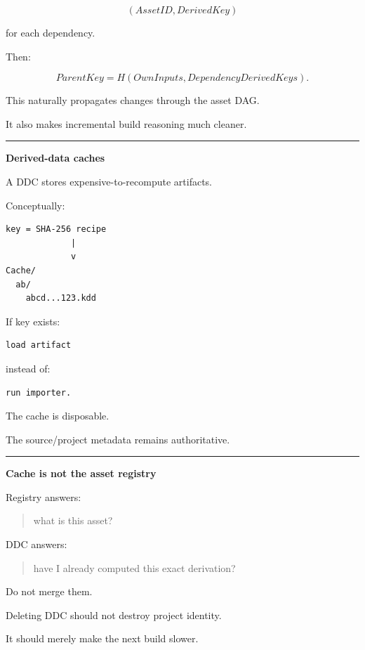 \[
(AssetID,DerivedKey)
\]

for each dependency.

Then:

\[
ParentKey=
H(
OwnInputs,
DependencyDerivedKeys
).
\]

This naturally propagates changes through the asset DAG.

It also makes incremental build reasoning much cleaner.

\begin{center}\rule{0.5\linewidth}{0.5pt}\end{center}

\textbf{Derived-data caches}

A DDC stores expensive-to-recompute artifacts.

Conceptually:

\begin{verbatim}
key = SHA-256 recipe
             |
             v
Cache/
  ab/
    abcd...123.kdd
\end{verbatim}

If key exists:

\begin{verbatim}
load artifact
\end{verbatim}

instead of:

\begin{verbatim}
run importer.
\end{verbatim}

The cache is disposable.

The source/project metadata remains authoritative.

\begin{center}\rule{0.5\linewidth}{0.5pt}\end{center}

\textbf{Cache is not the asset registry}

Registry answers:

\begin{quote}
what is this asset?
\end{quote}

DDC answers:

\begin{quote}
have I already computed this exact derivation?
\end{quote}

Do not merge them.

Deleting DDC should not destroy project identity.

It should merely make the next build slower.

